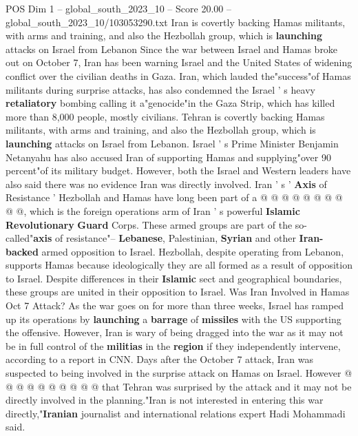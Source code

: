 \begin{textsample}{POS Dim 1 – global\_south\_2023\_10 – Score 20.00 – global\_south\_2023\_10/103053290.txt}  \label{ex:f1_pos_057}
Iran is covertly backing Hamas militants, with arms and training, and also the Hezbollah group, which is \textbf{launching} attacks on Israel from Lebanon Since the war between Israel and Hamas broke out on October 7, Iran has been warning Israel and the United States of widening conflict over the civilian deaths in Gaza.
Iran, which lauded the"success"of Hamas militants during surprise attacks, has also condemned the Israel ' s heavy \textbf{retaliatory} bombing calling it a"genocide"in the Gaza Strip, which has killed more than 8,000 people, mostly civilians.
Tehran is covertly backing Hamas militants, with arms and training, and also the Hezbollah group, which is \textbf{launching} attacks on Israel from Lebanon.
Israel ' s Prime Minister Benjamin Netanyahu has also accused Iran of supporting Hamas and supplying"over 90 percent"of its military budget.
However, both the Israel and Western leaders have also said there was no evidence Iran was directly involved.
Iran ' s ' \textbf{Axis} of Resistance ' Hezbollah and Hamas have long been part of a @ @ @ @ @ @ @ @ @ @, which is the foreign operations arm of Iran ' s powerful \textbf{Islamic} \textbf{Revolutionary} \textbf{Guard} Corps.
These armed groups are part of the so-called"\textbf{axis} of resistance"-- \textbf{Lebanese}, Palestinian, \textbf{Syrian} and other \textbf{Iran-backed} armed opposition to Israel.
Hezbollah, despite operating from Lebanon, supports Hamas because ideologically they are all formed as a result of opposition to Israel.
Despite differences in their \textbf{Islamic} sect and geographical boundaries, these groups are united in their opposition to Israel.
Was Iran Involved in Hamas Oct 7 Attack?
As the war goes on for more than three weeks, Israel has ramped up its operations by \textbf{launching} a \textbf{barrage} of \textbf{missiles} with the US supporting the offensive.
However, Iran is wary of being dragged into the war as it may not be in full control of the \textbf{militias} in the \textbf{region} if they independently intervene, according to a report in CNN.
Days after the October 7 attack, Iran was suspected to being involved in the surprise attack on Hamas on Israel.
However @ @ @ @ @ @ @ @ @ @ that Tehran was surprised by the attack and it may not be directly involved in the planning."Iran is not interested in entering this war directly,"\textbf{Iranian} journalist and international relations expert Hadi Mohammadi said.

\end{textsample}
